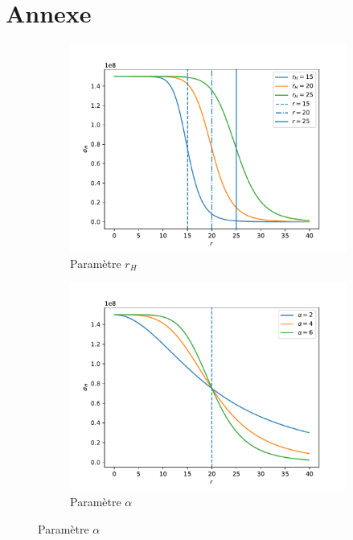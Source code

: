 \documentclass{article}
\begin{document}
\pagebreak

\section{Annexe}

\begin{figure}[H]
	\centering
	\begin{subfigure}{.7\linewidth}
		\centering
		\includegraphics[scale=0.54]{images/sigma_r_H.pdf}
		\caption{Paramètre $r_H$}
		\label{subfig:r_H}
	\end{subfigure}
	\begin{subfigure}{.7\linewidth}
		\centering
		\includegraphics[scale=0.54]{images/sigma_alpha.pdf}
		\caption{Paramètre $\alpha$}

\end{subfigure}
\end{figure}
\end{document}
